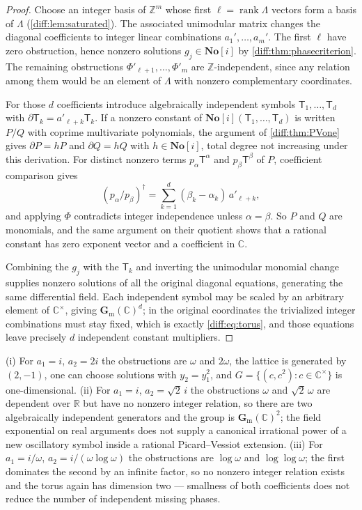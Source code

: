 \documentclass[11pt,letterpaper]{article}
\numberwithin{equation}{section}
\theoremstyle{definition}
\theoremstyle{remark}
\newcommand{\SC}{\mathbf{No}[i]}
\newcommand{\R}{\mathbb R}
\newcommand{\C}{\mathbb C}
\newcommand{\Z}{\mathbb Z}
\newcommand{\der}{\partial}
\newcommand{\gm}{\mathbf G_{\mathrm m}}
\begin{document}
\begin{proof}
Choose an integer basis of $\Z^{m}$ whose first
$\ell=\operatorname{rank}\Lambda$ vectors form a basis of $\Lambda$
(\cref{diff:lem:saturated}). The associated unimodular matrix changes the
diagonal coefficients to integer linear combinations $a_{1}',\dots,a_{m}'$.
The first $\ell$ have zero obstruction, hence nonzero solutions
$g_{j}\in\SC$ by \cref{diff:thm:phasecriterion}. The remaining obstructions
$\Phi'_{\ell+1},\dots,\Phi'_{m}$ are $\Z$-independent, since any relation among them
would be an element of $\Lambda$ with nonzero complementary coordinates.

For those $d$ coefficients introduce algebraically independent symbols
$\mathsf T_{1},\dots,\mathsf T_{d}$ with $\der \mathsf T_{k}=a'_{\ell+k}\mathsf T_{k}$. If a nonzero constant
of $\SC(\mathsf T_{1},\dots,\mathsf T_{d})$ is written $P/Q$ with coprime multivariate
polynomials, the argument of \cref{diff:thm:PVone} gives $\der P=hP$ and
$\der Q=hQ$ with $h\in\SC$, total degree not increasing under this derivation.
For distinct nonzero terms $p_{\alpha}\mathsf T^{\alpha}$ and $p_{\beta}\mathsf T^{\beta}$ of
$P$, coefficient comparison gives
\[
 (p_{\alpha}/p_{\beta})^{\dagger}
 =\sum_{k=1}^{d}(\beta_{k}-\alpha_{k})\,a'_{\ell+k},
\]
and applying $\Phi$ contradicts integer independence unless
$\alpha=\beta$. So $P$ and $Q$ are monomials, and the same argument on their
quotient shows that a rational constant has zero exponent vector and a
coefficient in $\C$.

Combining the $g_{j}$ with the $\mathsf T_{k}$ and inverting the unimodular monomial
change supplies nonzero solutions of all the original diagonal equations,
generating the same differential field. Each independent symbol may be scaled
by an arbitrary element of $\C^{\times}$, giving $\gm(\C)^{d}$; in the
original coordinates the trivialized integer combinations must stay fixed,
which is exactly \cref{diff:eq:torus}, and those equations leave precisely $d$
independent constant multipliers.
\end{proof}

\begin{example}
\label{diff:ex:torusexamples}
(i) For $a_{1}=i$, $a_{2}=2i$ the obstructions are $\omega$ and $2\omega$, the
lattice is generated by $(2,-1)$, one can choose solutions with
$y_{2}=y_{1}^{2}$, and $G=\{(c,c^{2}):c\in\C^{\times}\}$ is one-dimensional.
(ii) For $a_{1}=i$, $a_{2}=\sqrt2\,i$ the obstructions $\omega$ and
$\sqrt2\,\omega$ are dependent over $\R$ but have no nonzero integer relation,
so there are two algebraically independent generators and the group is
$\gm(\C)^{2}$; the field exponential on real arguments does not supply a
canonical irrational power of a new oscillatory symbol inside a rational
Picard--Vessiot extension. (iii) For $a_{1}=i/\omega$,
$a_{2}=i/(\omega\log\omega)$ the obstructions are $\log\omega$ and
$\log\log\omega$; the first dominates the second by an infinite factor, so no
nonzero integer relation exists and the torus again has dimension two ---
smallness of both coefficients does not reduce the number of independent
missing phases.
\end{example}
\end{document}
